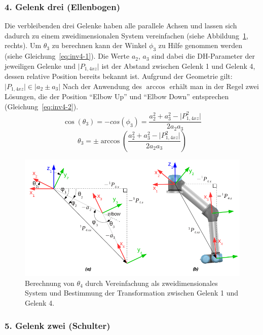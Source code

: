 \subsubsection{4. Gelenk drei (Ellenbogen)}

Die verbleibenden drei Gelenke haben alle parallele Achsen und lassen sich dadurch zu einem zweidimensionalen System vereinfachen (siehe Abbildung~\ref{fig:inv1-4}, rechts).
Um $\theta_3$ zu berechnen kann der Winkel $\phi_3$ zu Hilfe genommen werden (siehe Gleichung~\ref{eq:inv4-1}).
Die Werte $a_2$, $a_3$ sind dabei die DH-Parameter der jeweiligen Gelenke und $\lvert P_{1,4xz} \rvert$ ist der Abstand zwischen Gelenk 1 und Gelenk 4, dessen relative Position bereits bekannt ist.
Aufgrund der Geometrie gilt: $\lvert P_{1,4xz} \rvert \in \lvert a_2 \pm a_3 \rvert$
Nach der Anwendung des $\arccos$ erhält man in der Regel zwei Lösungen, die der Position \enquote{Elbow Up} und \enquote{Elbow Down} entsprechen (Gleichung~\ref{eq:inv4-2}).
\begin{equation}
    \cos(\theta_3) = -cos(\phi_3) = \frac{a_2^2 + a_3^2 - \lvert P_{1,4xz}^2 \rvert}{2 a_2 a_3}   \label{eq:inv4-1}
\end{equation}
\begin{equation}
    \theta_3 = \pm \arccos \left(  \frac{a_2^2 + a_3^2 - \lvert P_{1,4xz}^2 \rvert}{2 a_2 a_3} \right)  \label{eq:inv4-2}
\end{equation}
\begin{figure}[h]
    \centering
    \includegraphics[width = .8\textwidth]{Bilder/inv4}
    \caption{Berechnung von $\theta_4$ durch Vereinfachung als zweidimensionales System und Bestimmung der Transformation zwischen Gelenk 1 und Gelenk 4.}\label{fig:inv1-4}
\end{figure}

\subsubsection{5. Gelenk zwei (Schulter)}

